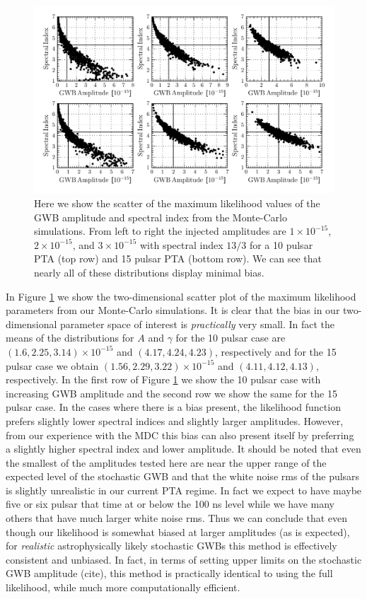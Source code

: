 \documentclass[iop]{emulateapj}
\begin{document}
\begin{figure}[!t]
  \begin{center}
	\includegraphics[scale=1.0]{EDF_scatter.pdf}
  \end{center}
  \caption{Here we show the scatter of the maximum likelihood values of the GWB amplitude and spectral index from the Monte-Carlo simulations. From left to right the injected amplitudes are $1\times 10^{-15}$, $2\times 10^{-15}$, and $3\times 10^{-15}$ with spectral index $13/3$ for a 10 pulsar PTA (top row) and 15 pulsar PTA (bottom row). We can see that nearly all of these distributions display minimal bias. }
\label{fig:edf_scatter}
\end{figure}
In Figure \ref{fig:edf_scatter} we show the two-dimensional scatter plot of the maximum likelihood parameters from our Monte-Carlo simulations. It is clear that the bias in our two-dimensional parameter space of interest is \emph{practically} very small. In fact the means of the distributions for $A$ and $\gamma$ for the 10 pulsar case are $(1.6,2.25,3.14)\times 10^{-15}$ and $(4.17,4.24,4.23)$, respectively and for the 15 pulsar case we obtain $(1.56,2.29,3.22)\times 10^{-15}$ and $(4.11,4.12,4.13)$, respectively. In the first row of Figure \ref{fig:edf_scatter} we show the 10 pulsar case with increasing GWB amplitude and the second row we show the same for the 15 pulsar case. In the cases where there is a bias present, the likelihood function prefers slightly lower spectral indices and slightly larger amplitudes. However, from our experience with the MDC this bias can also present itself by preferring a slightly higher spectral index and lower amplitude.   It should  be noted that even the smallest of the amplitudes tested here are near the upper range of  the expected level of the stochastic GWB \citep{s13} and that the white noise rms of the pulsars is slightly unrealistic in our current PTA regime. In fact we expect to have maybe five or six pulsar that time at or below the 100 ns level while we have many others that have much larger white noise rms. Thus we can conclude that even though our likelihood is somewhat biased at larger amplitudes (as is expected), for \emph{realistic} astrophysically likely stochastic GWBs this method is effectively consistent and unbiased. In fact, in terms of setting upper limits on the stochastic GWB amplitude (cite), this method is practically identical to using the full likelihood, while much more computationally efficient.
\end{document}

